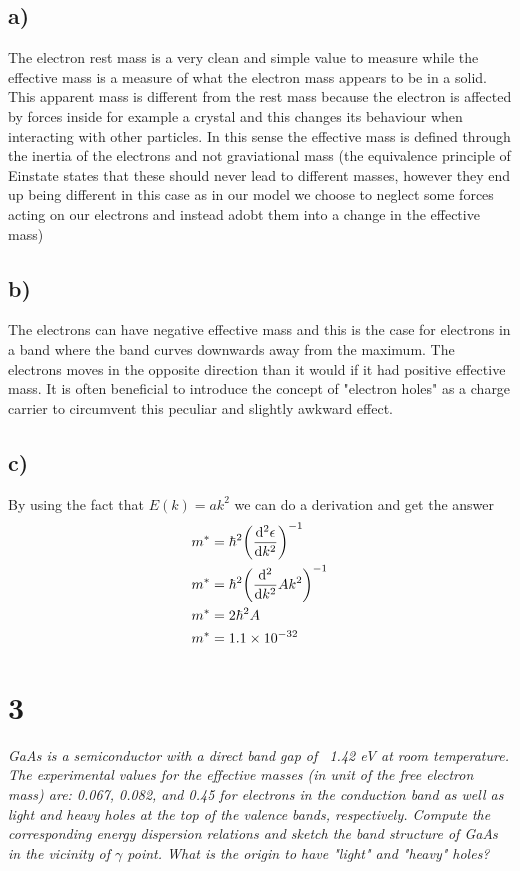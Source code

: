 \documentclass{article}
\newcommand{\bigexp}[2]{\qty(#1)^{#2}}
\begin{document}
\subsection*{a)}
The electron rest mass is a very clean and simple value to measure while the effective mass is a measure of what the electron mass appears to be in a solid. This apparent mass is different from the rest mass because the electron is affected by forces inside for example a crystal and this changes its behaviour when interacting with other particles. In this sense the effective mass is defined through the inertia of the electrons and not graviational mass (the equivalence principle of Einstate states that these should never lead to different masses, however they end up being different in this case as in our model we choose to neglect some forces acting on our electrons and instead adobt them into a change in the effective mass)

\subsection*{b)}
The electrons can have negative effective mass and this is the case for electrons in a band where the band curves downwards away from the maximum. The electrons moves in the opposite direction than it would if it had positive effective mass. It is often beneficial to introduce the concept of "electron holes" as a charge carrier to circumvent this peculiar and slightly awkward effect.

\subsection*{c)}
By using the fact that $E(k) = ak^2$ we can do a derivation and get the answer
\begin{align*}
	m^* &= \hbar^2\bigexp{\dv[2]{\epsilon}{k}}{-1}\\
	m^*&= \hbar^2\bigexp{\dv[2]{}{k}Ak^2}{-1}\\
	m^*&= 2\hbar^2A\\
	m^*&= 1.1\times10^{-32}
\end{align*}

\newpage
\section*{3}

\emph{GaAs is a semiconductor with a direct band gap of ~1.42 eV at room temperature. The
experimental values for the effective masses (in unit of the free electron mass) are: 0.067, 0.082,
and 0.45 for electrons in the conduction band as well as light and heavy holes at the top of the
valence bands, respectively. Compute the corresponding energy dispersion relations and sketch
the band structure of GaAs in the vicinity of $\gamma$ point. What is the origin to have "light" and
"heavy" holes?}
\end{document}
